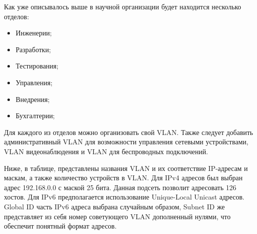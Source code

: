Как уже описывалось выше в научной организации будет находится несколько отделов:

\begin{itemize}
    \item Инженерии;
    \item Разработки;
    \item Тестирования;
    \item Управления;
    \item Внедрения;
    \item Бухгалтерии;
\end{itemize}

Для каждого из отделов можно организовать свой VLAN. Также следует добавить административный VLAN для возможности управления сетевыми устройствами,
VLAN видеонаблюдения и VLAN для беспроводных подключений.

Ниже, в таблице, представлены названия VLAN и их соответствие IP-адресам и маскам, а также количество устройств в VLAN. Для IPv4 адресов 
был выбран адрес 192.168.0.0 с маской 25 бита. Данная подсеть позволит адресовать 126 хостов. Для IPv6 предполагается использование 
Unique-Local Unicast адресов. Global ID часть IPv6 адреса выбрана случайным образом, 
Subnet ID же представляет из себя номер советующего VLAN дополненный нулями, что обеспечит понятный формат адресов. 

